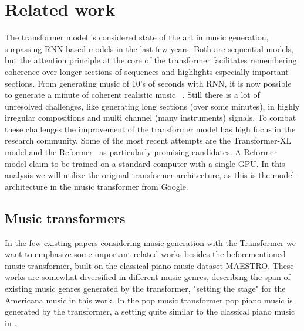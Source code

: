 \documentclass{IEEEtran}
\begin{document}
\section{Related work}

The transformer model is considered state of the art
in music generation, surpassing RNN-based models in the last few years. Both
are sequential models, but the attention principle at the core of the
transformer facilitates remembering coherence over longer sections of
sequences and highlights especially important sections. From generating music
of 10's of seconds with RNN, it is now possible to generate a minute of
coherent realistic music ~\cite{huang2018music}. Still there is a lot of
unresolved challenges, like generating long sections (over some minutes), in
highly irregular compositions and multi channel (many instruments) signals.
To combat these challenges the improvement of the transformer model has high
focus in the research community. Some of the most recent attempts are the
Transformer-XL~\cite{dai2019transformerxl} model and the
Reformer~\cite{kitaev2020reformer} as particularly promising candidates. A
Reformer model claim to be trained on a standard computer with a single GPU.
In this analysis we will utilize the original transformer architecture, as
this is the model-architecture in the music transformer from Google.

\subsection{Music transformers}

In the few existing papers considering music
generation with the Transformer we want to emphasize some important related
works besides the beforementioned music transformer, built on the classical
piano music dataset MAESTRO. These works are somewhat diversified in
different music genres, describing the span of existing music genres
generated by the transformer, "setting the stage" for the Americana music in
this work. In the pop music transformer \cite{huang2020pop} pop piano music
is generated by the transformer, a setting quite similar to the classical
piano music in \cite{huang2018music}.
\end{document}
